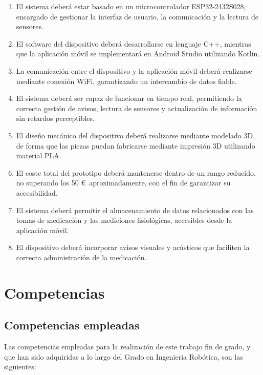 \begin{enumerate}
\item El sistema deberá estar basado en un microcontrolador ESP32-2432S028, encargado de gestionar la interfaz de usuario, la comunicación y la lectura de sensores.

\item El software del dispositivo deberá desarrollarse en lenguaje C++, mientras que la aplicación móvil se implementará en Android Studio utilizando Kotlin.

\item La comunicación entre el dispositivo y la aplicación móvil deberá realizarse mediante conexión WiFi, garantizando un intercambio de datos fiable.

\item El sistema deberá ser capaz de funcionar en tiempo real, permitiendo la correcta gestión de avisos, lectura de sensores y actualización de información sin retardos perceptibles.

\item El diseño mecánico del dispositivo deberá realizarse mediante modelado 3D, de forma que las piezas puedan fabricarse mediante impresión 3D utilizando material PLA.

\item El coste total del prototipo deberá mantenerse dentro de un rango reducido, no superando los {50} \euro\  aproximadamente, con el fin de garantizar su accesibilidad.

\item El sistema deberá permitir el almacenamiento de datos relacionados con las tomas de medicación y las mediciones fisiológicas, accesibles desde la aplicación móvil.

\item El dispositivo deberá incorporar avisos visuales y acústicos que faciliten la correcta administración de la medicación.
\end{enumerate}

\section{Competencias}
\label{sec:competencias}

\subsection{Competencias empleadas}

Las competencias empleadas para la realización de este trabajo fin de grado, y que han sido adquiridas a lo largo del Grado en Ingeniería Robótica, son las siguientes:

